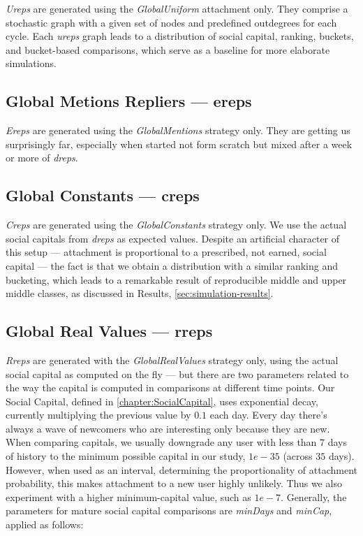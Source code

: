 \documentclass[10pt,oneside]{memoir}
\begin{document}
{\itshape Ureps} are generated using the {\itshape GlobalUniform} attachment only.  They comprise a stochastic graph with a given set of nodes and predefined outdegrees for each cycle.  Each {\itshape ureps} graph leads to a distribution of social capital, ranking, buckets, and bucket-based comparisons, which serve as a baseline for more elaborate simulations.


\subsection{Global Metions Repliers --- ereps}
\label{globalmetionsrepliersereps}

{\itshape Ereps} are generated using the {\itshape GlobalMentions} strategy only.  They are getting us surprisingly far, especially when started not form scratch but mixed after a week or more of {\itshape dreps}.


\subsection{Global Constants --- creps}
\label{globalconstantscreps}

{\itshape Creps} are generated using the {\itshape GlobalConstants} strategy only.  We use the actual social capitals from {\itshape dreps} as expected values.  Despite an artificial character of this setup --- attachment is proportional to a prescribed, not earned, social capital --- the fact is that we obtain a distribution with a similar ranking and bucketing, which leads to a remarkable result of reproducible middle and upper middle classes, as discussed in Results, \ref{sec:simulation-results}.


\subsection{Global Real Values --- rreps}
\label{globalrealvaluesrreps}

{\itshape Rreps} are generated with the {\itshape GlobalRealValues} strategy only, using the actual social capital as computed on the fly --- but there are two parameters related to the way the capital is computed in comparisons at different time points.  Our Social Capital, defined in \ref{chapter:SocialCapital}, uses exponential decay, currently multiplying the previous value by $0.1$ each day.  Every day there's always a wave of newcomers who are interesting only because they are new.  When comparing capitals, we usually downgrade any user with less than $7$ days of history to the minimum possible capital in our study, $1e-35$ (across $35$ days).  However, when used as an interval, determining the proportionality of attachment probability, this makes attachment to a new user highly unlikely.  Thus we also experiment with a higher minimum-capital value, such as $1e-7$.  Generally, the parameters for mature social capital comparisons are {\itshape minDays} and {\itshape minCap}, applied as follows:
\end{document}
